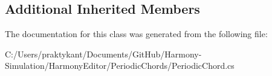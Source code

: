 \subsection*{Additional Inherited Members}


The documentation for this class was generated from the following file\+:\begin{DoxyCompactItemize}
\item 
C\+:/\+Users/praktykant/\+Documents/\+Git\+Hub/\+Harmony-\/\+Simulation/\+Harmony\+Editor/\+Periodic\+Chords/Periodic\+Chord.\+cs\end{DoxyCompactItemize}
